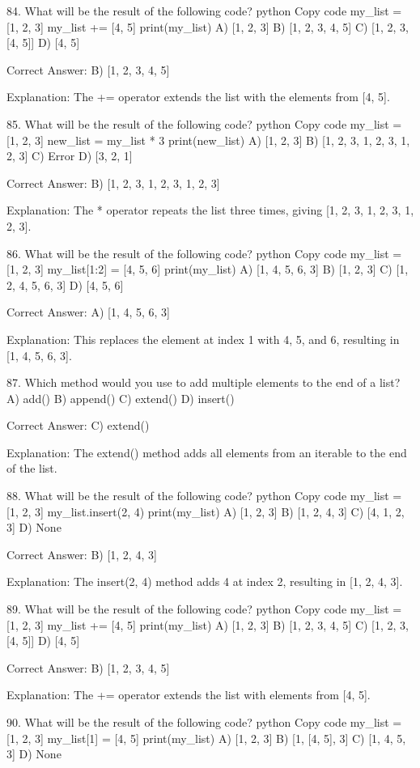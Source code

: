 84. What will be the result of the following code?
python
Copy code
my_list = [1, 2, 3]
my_list += [4, 5]
print(my_list)
A) [1, 2, 3]
B) [1, 2, 3, 4, 5]
C) [1, 2, 3, [4, 5]]
D) [4, 5]

Correct Answer: B) [1, 2, 3, 4, 5]

Explanation:
The += operator extends the list with the elements from [4, 5].

85. What will be the result of the following code?
python
Copy code
my_list = [1, 2, 3]
new_list = my_list * 3
print(new_list)
A) [1, 2, 3]
B) [1, 2, 3, 1, 2, 3, 1, 2, 3]
C) Error
D) [3, 2, 1]

Correct Answer: B) [1, 2, 3, 1, 2, 3, 1, 2, 3]

Explanation:
The * operator repeats the list three times, giving [1, 2, 3, 1, 2, 3, 1, 2, 3].

86. What will be the result of the following code?
python
Copy code
my_list = [1, 2, 3]
my_list[1:2] = [4, 5, 6]
print(my_list)
A) [1, 4, 5, 6, 3]
B) [1, 2, 3]
C) [1, 2, 4, 5, 6, 3]
D) [4, 5, 6]

Correct Answer: A) [1, 4, 5, 6, 3]

Explanation:
This replaces the element at index 1 with 4, 5, and 6, resulting in [1, 4, 5, 6, 3].

87. Which method would you use to add multiple elements to the end of a list?
A) add()
B) append()
C) extend()
D) insert()

Correct Answer: C) extend()

Explanation:
The extend() method adds all elements from an iterable to the end of the list.

88. What will be the result of the following code?
python
Copy code
my_list = [1, 2, 3]
my_list.insert(2, 4)
print(my_list)
A) [1, 2, 3]
B) [1, 2, 4, 3]
C) [4, 1, 2, 3]
D) None

Correct Answer: B) [1, 2, 4, 3]

Explanation:
The insert(2, 4) method adds 4 at index 2, resulting in [1, 2, 4, 3].

89. What will be the result of the following code?
python
Copy code
my_list = [1, 2, 3]
my_list += [4, 5]
print(my_list)
A) [1, 2, 3]
B) [1, 2, 3, 4, 5]
C) [1, 2, 3, [4, 5]]
D) [4, 5]

Correct Answer: B) [1, 2, 3, 4, 5]

Explanation:
The += operator extends the list with elements from [4, 5].

90. What will be the result of the following code?
python
Copy code
my_list = [1, 2, 3]
my_list[1] = [4, 5]
print(my_list)
A) [1, 2, 3]
B) [1, [4, 5], 3]
C) [1, 4, 5, 3]
D) None

